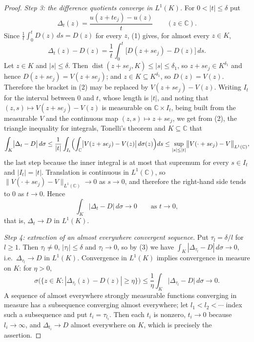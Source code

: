 \begin{proof}
\emph{Step 3: the difference quotients converge in $L^{1}(K)$.}  For
$0<|t|\le\delta$ put
\[
  \Delta_t(z)=\frac{u(z+te_j)-u(z)}{t}\qquad(z\in\mathbb{C}).
\]
Since $\frac1t\int_0^tD(z)\,ds=D(z)$ for every $z$, (1) gives, for almost
every $z\in K$,
\begin{equation}\tag{2}
  \Delta_t(z)-D(z)=\frac1t\int_0^t\bigl[D(z+se_j)-D(z)\bigr]\,ds .
\end{equation}
Let $z\in K$ and $|s|\le\delta$.  Then
$\operatorname{dist}(z+se_j,K)\le|s|\le\delta_1$, so $z+se_j\in K^{\delta_1}$
and hence $D(z+se_j)=V(z+se_j)$; and $z\in K\subseteq K^{\delta_1}$, so
$D(z)=V(z)$.  Therefore the bracket in (2) may be replaced by
$V(z+se_j)-V(z)$.  Writing $I_t$ for the interval between $0$ and $t$, whose
length is $|t|$, and noting that $(z,s)\mapsto V(z+se_j)-V(z)$ is measurable
on $\mathbb{C}\times I_t$, being built from the measurable $V$ and the
continuous map $(z,s)\mapsto z+se_j$, we get from (2), the triangle
inequality for integrals, Tonelli's theorem and $K\subseteq\mathbb{C}$ that
\[
  \int_K\bigl|\Delta_t-D\bigr|\,d\sigma
  \le\frac1{|t|}\int_{I_t}\Bigl(\int_{\mathbb{C}}
      \bigl|V(z+se_j)-V(z)\bigr|\,d\sigma(z)\Bigr)ds
  \le\sup_{|s|\le|t|}\bigl\|V(\cdot+se_j)-V\bigr\|_{L^{1}(\mathbb{C})} ,
\]
the last step because the inner integral is at most that supremum for every
$s\in I_t$ and $|I_t|=|t|$.  Translation is continuous in
$L^{1}(\mathbb{C})$, so $\|V(\cdot+se_j)-V\|_{L^{1}(\mathbb{C})}\to0$ as
$s\to0$, and therefore the right-hand side tends to $0$ as $t\to0$.  Hence
\begin{equation}\tag{3}
  \int_K\bigl|\Delta_t-D\bigr|\,d\sigma\longrightarrow0
  \qquad\text{as }t\to0 ,
\end{equation}
that is, $\Delta_t\to D$ in $L^{1}(K)$.

\emph{Step 4: extraction of an almost everywhere convergent sequence.}  Put
$\tau_l=\delta/l$ for $l\ge1$.  Then $\tau_l\neq0$, $|\tau_l|\le\delta$ and
$\tau_l\to0$, so by (3) we have $\int_K|\Delta_{\tau_l}-D|\,d\sigma\to0$,
i.e.\ $\Delta_{\tau_l}\to D$ in $L^{1}(K)$.  Convergence in $L^{1}(K)$
implies convergence in measure on $K$: for $\eta>0$,
\[
  \sigma\bigl(\{z\in K:|\Delta_{\tau_l}(z)-D(z)|\ge\eta\}\bigr)
  \le\frac1\eta\int_K\bigl|\Delta_{\tau_l}-D\bigr|\,d\sigma
  \longrightarrow0 .
\]
A sequence of almost everywhere strongly measurable functions converging in
measure has a subsequence converging almost everywhere; let
$l_1<l_2<\cdots$ index such a subsequence and put $t_i=\tau_{l_i}$.  Then
each $t_i$ is nonzero, $t_i\to0$ because $l_i\to\infty$, and
$\Delta_{t_i}\to D$ almost everywhere on $K$, which is precisely the
assertion.
\end{proof}
